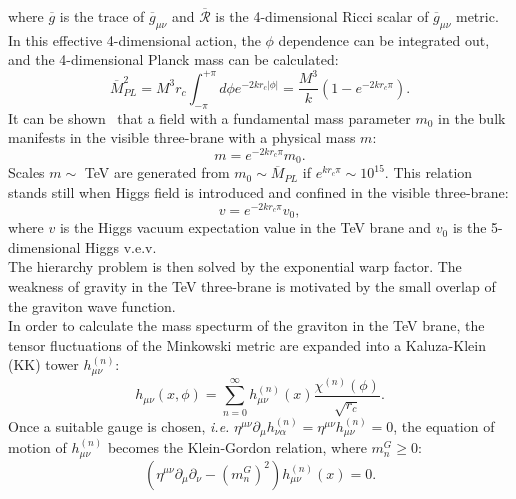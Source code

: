 where $\overline{g}$ is the trace of $\overline{g}_{\mu \nu}$ and $\overline{\mathcal{R}}$ is the 4-dimensional Ricci scalar of $\overline{g}_{\mu \nu}$ metric. In this effective 4-dimensional action, the $\phi$ dependence can be integrated out, and the 4-dimensional Planck mass can be calculated:
\begin{equation}
\overline{M}_{PL}^2 = M^3 r_c \int_{-\pi}^{+\pi} d \phi e^{-2 k r_c \left| \phi \right|} = \frac{M^3}{k} \left( 1 - e^{-2 k r_c \pi} \right).
\label{eq:theory_effective_planck_mass}
\end{equation}
It can be shown~\cite{Randall:1999ee} that a field with a fundamental mass parameter $m_0$ in the bulk manifests in the visible three-brane with a physical mass $m$:
\begin{equation}
m = e^{-2 k r_c \pi} m_0.
\label{eq:theory_effective_masses}
\end{equation}
Scales $m \sim$ TeV are generated from $m_0 \sim \overline{M}_{PL}$ if $e^{k r_c \pi} \sim 10^{15}$. This relation stands still when Higgs field is introduced and confined in the visible three-brane:
\begin{equation}
v = e^{-2 k r_c \pi} v_0,
\label{eq:theory_effective_Higgs_vev}
\end{equation}
where $v$ is the Higgs vacuum expectation value in the TeV brane and $v_0$ is the 5-dimensional Higgs v.e.v.\\
The hierarchy problem is then solved by the exponential warp factor. The weakness of gravity in the TeV three-brane is motivated by the small overlap of the graviton wave function.\\
In order to calculate the mass specturm of the graviton in the TeV brane, the tensor fluctuations of the Minkowski metric are expanded into a Kaluza-Klein (KK) tower $h_{\mu \nu}^{(n)}$:
\begin{equation}
h_{\mu \nu}(x, \phi) = \sum_{n=0}^{\infty} h_{\mu \nu}^{(n)}(x) \frac{\chi^{(n)}(\phi)}{\sqrt{r_c}}.
\label{eq:theory_RS_KK_tower}
\end{equation}
Once a suitable gauge is chosen, \textit{i.e.} $\eta^{\mu \nu} \partial_{\mu} h_{\nu \alpha}^{(n)} = \eta^{\mu \nu} h_{\mu \nu}^{(n)} = 0$, the equation of motion of $h_{\mu \nu}^{(n)}$ becomes the Klein-Gordon relation, where $m_n^G \geq 0$:
\begin{equation}
\left( \eta^{\mu \nu} \partial_{\mu} \partial_{\nu} - (m_n^G)^2 \right) h_{\mu \nu}^{(n)}(x)= 0.
\label{eq:theory_RS_KK_KleinGordon}
\end{equation}
